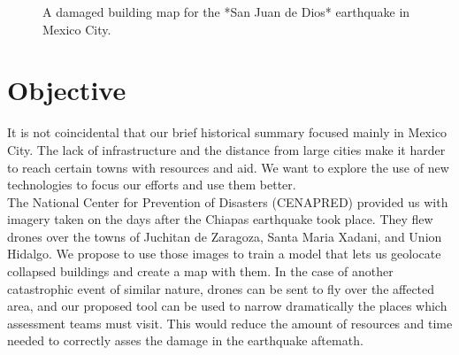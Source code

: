 \begin{figure}[h]
  \begin{center}
  \end{center}
  \label{fig:quake1800}
  \caption{A damaged building map for the *San Juan de Dios* earthquake in Mexico City.}
\end{figure}


\section{Objective}

It is not coincidental that our brief historical summary focused mainly in Mexico City. The lack of infrastructure and the distance from large cities make it harder to reach certain towns with resources and aid. We want to explore the use of new technologies to focus our efforts and use them better.\\

The National Center for Prevention of Disasters (CENAPRED) provided us with imagery taken on the days after the Chiapas earthquake took place. They flew drones over the towns of Juchitan de Zaragoza, Santa Maria Xadani, and Union Hidalgo. We propose to use those images to train a model that lets us geolocate collapsed buildings and create a map with them. In the case of another catastrophic event of similar nature, drones can be sent to fly over the affected area, and our proposed tool can be used to narrow dramatically the places which assessment teams must visit. This would reduce the amount of resources and time needed to correctly asses the damage in the earthquake aftemath.\\

